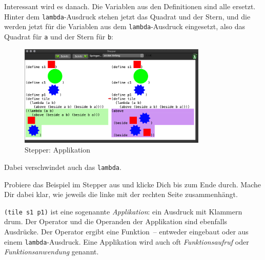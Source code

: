 %
\noindent Interessant wird es danach. Die Variablen aus den Definitionen sind
alle ersetzt.  Hinter dem \lstinline{lambda}-Ausdruck stehen jetzt das
Quadrat und der Stern, und die werden jetzt für die Variablen aus dem
\lstinline{lambda}-Ausdruck eingesetzt, also das Quadrat für \lstinline{a}
und der Stern für \lstinline{b}:
%
\begin{figure}[H]
  \centering
  \includegraphics[width=0.8\textwidth]{elemente/stepper-3}
  \caption{Stepper: Applikation}
  \label{fig:stepper-3}
\end{figure}
%
\noindent Dabei verschwindet auch das \lstinline{lambda}.
%
\begin{aufgabeinline}
  Probiere das Beispiel im Stepper aus und klicke Dich bis zum Ende
  durch. Mache Dir dabei klar, wie jeweils die linke mit der rechten
  Seite zusammenhängt.
\end{aufgabeinline}
%
\lstinline{(tile s1 p1)} ist eine sogenannte
\textit{Applikation}: ein Ausdruck mit
Klammern drum.  Der Operator und die Operanden der
Applikation sind ebenfalls Ausdrücke.  Der Operator ergibt eine
Funktion~-- entweder eingebaut oder aus einem
\lstinline{lambda}-Ausdruck.  Eine Applikation wird auch oft
\textit{Funktionsaufruf} oder
\textit{Funktionsanwendung} genannt.

